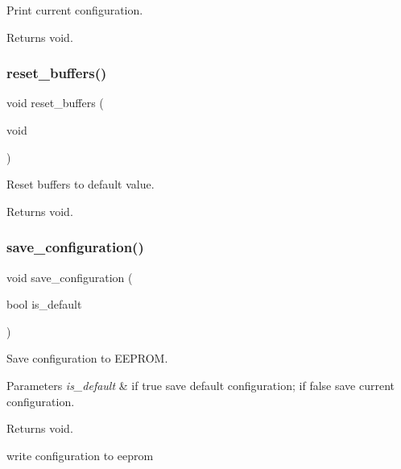 Print current configuration. 

\begin{DoxyReturn}{Returns}
void. 
\end{DoxyReturn}
\mbox{\label{i2c-rain_8h_a717429168fb5542a7b36a94712f7c67e}} 
\subsubsection{\texorpdfstring{reset\+\_\+buffers()}{reset\_buffers()}}
{\footnotesize\ttfamily void reset\+\_\+buffers (\begin{DoxyParamCaption}\item[{void}]{ }\end{DoxyParamCaption})}



Reset buffers to default value. 

\begin{DoxyReturn}{Returns}
void. 
\end{DoxyReturn}
\mbox{\label{i2c-rain_8h_a8801fa7c9f323c5b8b9b2bb5b1c438ff}} 
\subsubsection{\texorpdfstring{save\+\_\+configuration()}{save\_configuration()}}
{\footnotesize\ttfamily void save\+\_\+configuration (\begin{DoxyParamCaption}\item[{bool}]{is\+\_\+default }\end{DoxyParamCaption})}



Save configuration to E\+E\+P\+R\+OM. 


\begin{DoxyParams}{Parameters}
{\em is\+\_\+default} & if true save default configuration; if false save current configuration. \\
\hline
\end{DoxyParams}
\begin{DoxyReturn}{Returns}
void. 
\end{DoxyReturn}
write configuration to eeprom \mbox{\label{i2c-rain_8h_a7fcfeb4fd75663ddccc79030c37d68b9}} 

